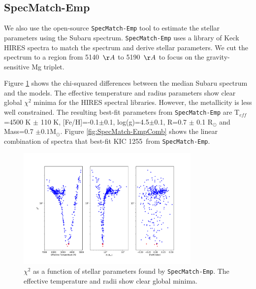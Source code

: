 \documentclass[preprint]{aastex61}
\newcommand{\shStar}{KIC 1255}
\begin{document}
\subsection{SpecMatch-Emp}\label{sec:SpecMatch-Emp}

We also use the open-source \texttt{SpecMatch-Emp} tool \citep{yee2017specMatch} to estimate the stellar parameters using the Subaru spectrum.
\texttt{SpecMatch-Emp} uses a library of Keck HIRES spectra to match the spectrum and derive stellar parameters.
We cut the spectrum to a region from 5140~$\AA$ to 5190~$\AA$ to focus on the gravity-sensitive Mg triplet.

Figure \ref{fig:SpecMatch-Emp} shows the chi-squared differences between the median Subaru spectrum and the models.
The effective temperature and radius parameters show clear global $\chi^2$ minima for the HIRES spectral libraries.
However, the metallicity is less well constrained.
The resulting best-fit parameters from \texttt{SpecMatch-Emp} are T$_{eff}$=4500 K $\pm$ 110 K, [Fe/H]=-0.1$\pm$0.1, log(g)=4.5$\pm$0.1, R=0.7 $\pm$ 0.1 R$_\odot$ and Mass=0.7 $\pm 0.1 $M$_\odot$.
Figure \ref{fig:SpecMatch-EmpComb} shows the linear combination of spectra that best-fit \shStar\ from \texttt{SpecMatch-Emp}.

\begin{figure}[!hbtp]
\begin{centering}
\includegraphics[width=0.8\textwidth]{images/subaru/spec_chi_min.pdf}
\caption{$\chi^2$ as a function of stellar parameters found by \texttt{SpecMatch-Emp}.
The effective temperature and radii show clear global minima.}\label{fig:SpecMatch-Emp}
\end{centering}
\end{figure}
\end{document}
